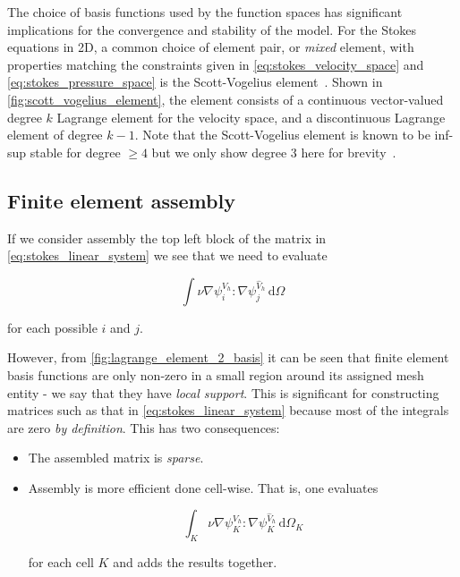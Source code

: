 \documentclass[thesis]{subfiles}
\begin{document}
The choice of basis functions used by the function spaces has significant implications for the convergence and stability of the model.
For the Stokes equations in 2D, a common choice of element pair, or \textit{mixed} element, with properties matching the constraints given in \cref{eq:stokes_velocity_space} and \cref{eq:stokes_pressure_space} is the Scott-Vogelius element~\cite{scottNormEstimatesMaximal1985}.
Shown in \cref{fig:scott_vogelius_element}, the element consists of a continuous vector-valued degree $k$ Lagrange element for the velocity space, and a discontinuous Lagrange element of degree $k-1$.
Note that the Scott-Vogelius element is known to be inf-sup stable for degree $\geq 4$ but we only show degree 3 here for brevity~\cite{guzmanScottVogeliusFiniteElements2018}.

\subsection{Finite element assembly}

If we consider assembly the top left block of the matrix in \cref{eq:stokes_linear_system} we see that we need to evaluate

\begin{equation*}
  \int \nu \nabla \psi^{V_h}_i : \nabla \psi^{\hat V_h}_j \, \textrm{d}\Omega
\end{equation*}

for each possible $i$ and $j$.

However, from \cref{fig:lagrange_element_2_basis} it can be seen that finite element basis functions are only non-zero in a small region around its assigned mesh entity - we say that they have \textit{local support}.
This is significant for constructing matrices such as that in \cref{eq:stokes_linear_system} because most of the integrals are zero \textit{by definition}.
This has two consequences:

\begin{itemize}
  \item
    The assembled matrix is \textit{sparse}.

  \item 
    Assembly is more efficient done cell-wise. That is, one evaluates

    \begin{equation*}
      \int_K \nu \nabla \psi^{V_h}_K : \nabla \psi^{\hat V_h}_K \, \textrm{d}\Omega_K
    \end{equation*}

    for each cell $K$ and adds the results together.
\end{itemize}
\end{document}
